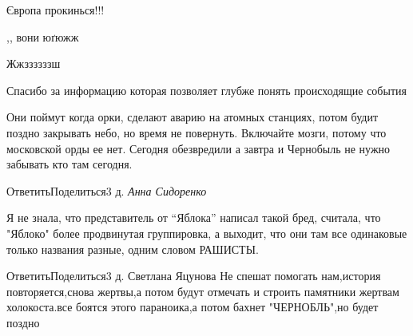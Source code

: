 \begin{itemize}
Європа прокинься!!!

,, вони юґюжж

Жжззззззш

Спасибо за информацию которая позволяет глубже понять происходящие события


Они поймут когда орки, сделают аварию на атомных станциях, потом будит поздно
закрывать небо, но время не повернуть. Включайте мозги, потому что московской
орды ее нет. Сегодня обезвредили а завтра и Чернобыль не нужно забывать кто там
сегодня.

ОтветитьПоделиться3 д.
\emph{Анна Сидоренко}

Я не знала, что представитель от \enquote{Яблока} написал такой бред, считала, что
"Яблоко" более продвинутая группировка, а выходит, что они там все одинаковые
только названия разные, одним словом РАШИСТЫ.

ОтветитьПоделиться3 д.
Светлана Яцунова
Не спешат помогать нам,история повторяется,снова жертвы,а потом будут отмечать и строить памятники жертвам холокоста.все боятся этого параноика,а потом бахнет "ЧЕРНОБЛЬ",но будет поздно

\end{itemize} %
